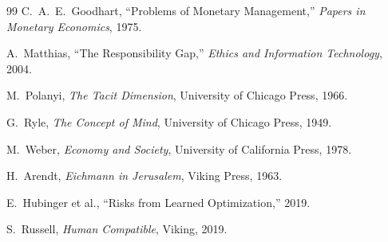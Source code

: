\begin{thebibliography}{99}
C.~A.~E.~Goodhart, ``Problems of Monetary Management,'' \emph{Papers in Monetary Economics}, 1975.

A.~Matthias, ``The Responsibility Gap,'' \emph{Ethics and Information Technology}, 2004.

M.~Polanyi, \emph{The Tacit Dimension}, University of Chicago Press, 1966.

G.~Ryle, \emph{The Concept of Mind}, University of Chicago Press, 1949.

M.~Weber, \emph{Economy and Society}, University of California Press, 1978.

H.~Arendt, \emph{Eichmann in Jerusalem}, Viking Press, 1963.

E.~Hubinger et al., ``Risks from Learned Optimization,'' 2019.

S.~Russell, \emph{Human Compatible}, Viking, 2019.

\end{thebibliography}




